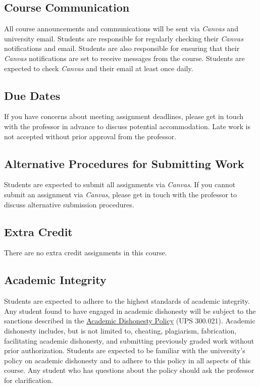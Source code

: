\documentclass[12pt, letterpaper]{article}
\begin{document}
\subsection*{Course Communication}
All course announcements and communications will be sent via \emph{Canvas} and university email. Students are responsible for regularly checking their \emph{Canvas} notifications and email. Students are also responsible for ensuring that their \emph{Canvas} notifications are set to receive messages from the course. Students are expected to check \emph{Canvas} and their email at least once daily.

\subsection*{Due Dates}
If you have concerns about meeting assignment deadlines, please get in touch with the professor in advance to discuss potential accommodation. Late work is not accepted without prior approval from the professor.

\subsection*{Alternative Procedures for Submitting Work}
Students are expected to submit all assignments via \emph{Canvas}. If you cannot submit an assignment via \emph{Canvas}, please get in touch with the professor to discuss alternative submission procedures.

\subsection*{Extra Credit}
There are no extra credit assignments in this course. 

\subsection*{Academic Integrity}
Students are expected to adhere to the highest standards of academic integrity. Any student found to have engaged in academic dishonesty will be subject to the sanctions described in the \href{https://www.fullerton.edu/senate/publications_policies_resolutions/ups/UPS%20300/UPS%20300.021.pdf}{Academic Dishonesty Policy} (UPS 300.021). Academic dishonesty includes, but is not limited to, cheating, plagiarism, fabrication, facilitating academic dishonesty, and submitting previously graded work without prior authorization. Students are expected to be familiar with the university's policy on academic dishonesty and to adhere to this policy in all aspects of this course. Any student who has questions about the policy should ask the professor for clarification.
\end{document}

